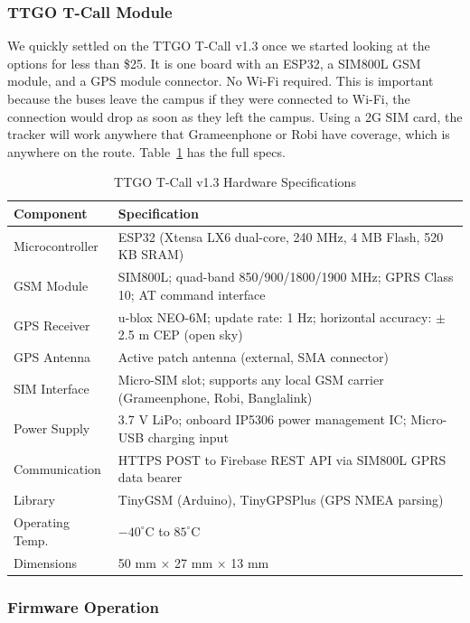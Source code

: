 \documentclass[12pt,a4paper]{report}
\begin{document}
\subsubsection{TTGO T-Call Module}

We quickly settled on the TTGO T-Call v1.3 once we started looking at the options for less than \$25. It is one board with an ESP32, a SIM800L GSM module, and a GPS module connector. No Wi-Fi required. This is important because the buses leave the campus if they were connected to Wi-Fi, the connection would drop as soon as they left the campus. Using a 2G SIM card, the tracker will work anywhere that Grameenphone or Robi have coverage, which is anywhere on the route. Table~\ref{tab:hwspec} has the full specs.

\begin{table}[t]
\caption{TTGO T-Call v1.3 Hardware Specifications}
\label{tab:hwspec}
\centering
\begin{tabularx}{\linewidth}{lX}
\toprule
\textbf{Component} & \textbf{Specification}\\
\midrule
Microcontroller   & ESP32 (Xtensa LX6 dual-core, 240 MHz, 4 MB Flash, 520 KB SRAM) \\
GSM Module        & SIM800L; quad-band 850/900/1800/1900 MHz; GPRS Class 10; AT command interface \\
GPS Receiver      & u-blox NEO-6M; update rate: 1 Hz; horizontal accuracy: $\pm$2.5 m CEP (open sky) \\
GPS Antenna       & Active patch antenna (external, SMA connector) \\
SIM Interface     & Micro-SIM slot; supports any local GSM carrier (Grameenphone, Robi, Banglalink) \\
Power Supply      & 3.7 V LiPo; onboard IP5306 power management IC; Micro-USB charging input \\
Communication     & HTTPS POST to Firebase REST API via SIM800L GPRS data bearer \\
Library           & TinyGSM (Arduino), TinyGPSPlus (GPS NMEA parsing) \\
Operating Temp.   & $-40^{\circ}$C to $85^{\circ}$C \\
Dimensions        & 50 mm $\times$ 27 mm $\times$ 13 mm \\
\bottomrule
\end{tabularx}
\end{table}

\subsubsection{Firmware Operation}
\end{document}
